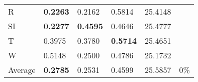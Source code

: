 \documentclass[11pt, a4paper]{article}
\begin{document}
\begin{table}[H]
\begin{tabular}{llllll}
R                                & \textbf{0.2263}                   & 0.2162                            & 0.5814                               & 25.4148                                     &                                   \\
SI                        & \textbf{0.2277}                   & \textbf{0.4595}                   & 0.4646                               & 25.4777                                     &                                   \\
T                              & 0.3975                            & 0.3780                            & \textbf{0.5714}                      & 25.4651                                     &                                   \\
W                             & 0.5148                            & 0.2500                            & 0.4786                               & 25.1732                                     &                                   \\ \hline
Average                               & \textbf{0.2785}                   & 0.2531                            & 0.4599                               & 25.5857                                     & 0\%
\end{tabular}
\end{table}
\end{document}

